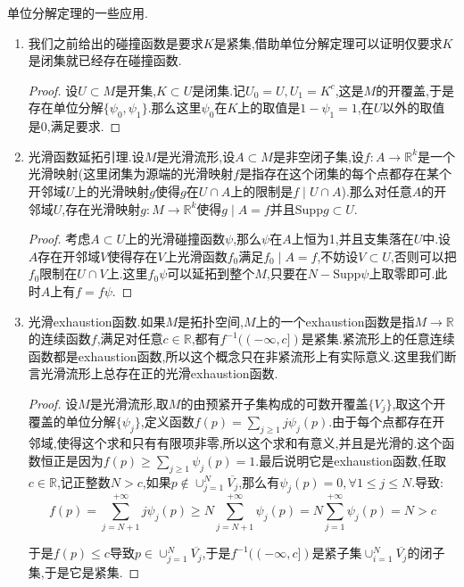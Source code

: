 单位分解定理的一些应用.
\begin{enumerate}
	\item 我们之前给出的碰撞函数是要求$K$是紧集,借助单位分解定理可以证明仅要求$K$是闭集就已经存在碰撞函数.
	\begin{proof}
		
		设$U\subset M$是开集,$K\subset U$是闭集.记$U_0=U,U_1=K^c$,这是$M$的开覆盖,于是存在单位分解$\{\psi_0,\psi_1\}$.那么这里$\psi_0$在$K$上的取值是$1-\psi_1=1$,在$U$以外的取值是$0$,满足要求.
	\end{proof}
    \item 光滑函数延拓引理.设$M$是光滑流形,设$A\subset M$是非空闭子集,设$f:A\to\mathbb{R}^k$是一个光滑映射(这里闭集为源端的光滑映射$f$是指存在这个闭集的每个点都存在某个开邻域$U$上的光滑映射$g$使得$g$在$U\cap A$上的限制是$f\mid U\cap A$).那么对任意$A$的开邻域$U$,存在光滑映射$g:M\to\mathbb{R}^k$使得$g\mid A=f$并且$\mathrm{Supp}g\subset U$.
    \begin{proof}
    	
    	考虑$A\subset U$上的光滑碰撞函数$\psi$,那么$\psi$在$A$上恒为1,并且支集落在$U$中.设$A$存在开邻域$V$使得存在$V$上光滑函数$f_0$满足$f_0\mid A=f$,不妨设$V\subset U$,否则可以把$f_0$限制在$U\cap V$上.这里$f_0\psi$可以延拓到整个$M$,只要在$N-\mathrm{Supp}\psi$上取零即可.此时$A$上有$f=f\psi$.
    \end{proof}
    \item 光滑exhaustion函数.如果$M$是拓扑空间,$M$上的一个exhaustion函数是指$M\to\mathbb{R}$的连续函数$f$,满足对任意$c\in\mathbb{R}$,都有$f^{-1}((-\infty,c])$是紧集.紧流形上的任意连续函数都是exhaustion函数,所以这个概念只在非紧流形上有实际意义.这里我们断言光滑流形上总存在正的光滑exhaustion函数.
    \begin{proof}
    	
    	设$M$是光滑流形,取$M$的由预紧开子集构成的可数开覆盖$\{V_j\}$,取这个开覆盖的单位分解$\{\psi_j\}$,定义函数$f(p)=\sum_{j\ge1}j\psi_j(p)$.由于每个点都存在开邻域,使得这个求和只有有限项非零,所以这个求和有意义,并且是光滑的.这个函数恒正是因为$f(p)\ge\sum_{j\ge1}\psi_j(p)=1$.最后说明它是exhaustion函数,任取$c\in\mathbb{R}$,记正整数$N>c$,如果$p\not\in\cup_{j=1}^N\overline{V_j}$,那么有$\psi_j(p)=0,\forall 1\le j\le N$.导致:
    	$$f(p)=\sum_{j=N+1}^{+\infty}j\psi_j(p)\ge N\sum_{j=N+1}^{+\infty}\psi_j(p)=N\sum_{j=1}^{+\infty}\psi_j(p)=N>c$$
    	
    	于是$f(p)\le c$导致$p\in\cup_{j=1}^N\overline{V_j}$,于是$f^{-1}((-\infty,c])$是紧子集$\cup_{i=1}^N\overline{V_j}$的闭子集,于是它是紧集.
    \end{proof}
\end{enumerate}

